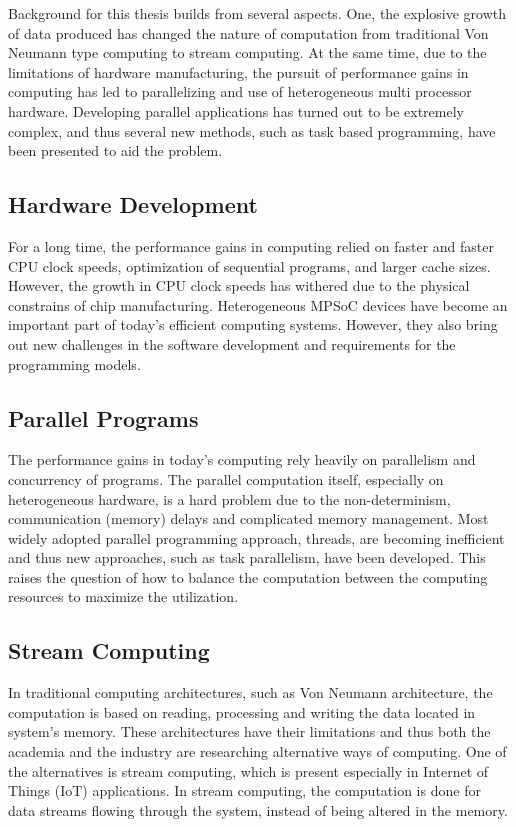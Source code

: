 Background for this thesis builds from several aspects. One, the explosive growth of data produced has changed the nature of computation from traditional Von Neumann type computing to stream computing. At the same time, due to the limitations of hardware manufacturing, the pursuit of performance gains in computing has led to parallelizing and use of heterogeneous multi processor hardware. Developing parallel applications has turned out to be extremely complex, and thus several new methods, such as task based programming, have been presented to aid the problem.

\subsection{Hardware Development}
For a long time, the performance gains in computing relied on faster and faster CPU clock speeds, optimization of sequential programs, and larger cache sizes. However, the growth in CPU clock speeds has withered due to the physical constrains of chip manufacturing. Heterogeneous MPSoC devices have become an important part of today's efficient computing systems. However, they also bring out new challenges in the software development and requirements for the programming models.

\subsection{Parallel Programs}
The performance gains in today's computing rely heavily on parallelism and concurrency of programs. The parallel computation itself, especially on heterogeneous hardware, is a hard problem due to the non-determinism, communication (memory) delays and complicated memory management. Most widely adopted  parallel programming approach, threads, are becoming inefficient and thus new approaches, such as task parallelism, have been developed. This raises the question of how to balance the computation between the computing resources to maximize the utilization.

\subsection{Stream Computing}
In traditional computing architectures, such as Von Neumann architecture, the computation is based on reading, processing and writing the data located in system's memory. These architectures have their limitations and thus both the academia and the industry are researching alternative ways of computing. One of the alternatives is stream computing, which is present especially in Internet of Things (IoT) applications. In stream computing, the computation is done for data streams flowing through the system, instead of being altered in the memory.

